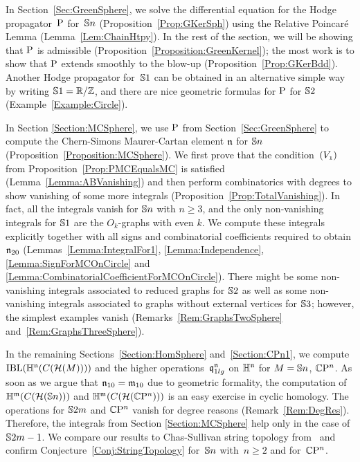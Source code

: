 \documentclass[\MainFolder/Text.tex]{subfiles}
\begin{document}
\label{Section:Computation}
In Section~\ref{Sec:GreenSphere}, we solve the differential equation for the Hodge propagator~$\mathrm{P}$ for~$\mathbb{S}{n}$ (Proposition~\ref{Prop:GKerSph}) using the Relative Poincar\'e Lemma (Lemma~\ref{Lem:ChainHtpy}). In the rest of the section, we will be showing that $\mathrm{P}$ is admissible (Proposition~\ref{Proposition:GreenKernel}); the most work is to show that $\mathrm{P}$ extends smoothly to the blow-up (Proposition~\ref{Prop:GKerBdd}). Another Hodge propagator for~$\mathbb{S}{1}$ can be obtained in an alternative simple way by writing $\mathbb{S}{1} = \mathbb{R} / \mathbb{Z}$, and there are nice geometric formulas for $\mathrm{P}$ for $\mathbb{S}{2}$ (Example~\ref{Example:Circle}).

In Section \ref{Section:MCSphere}, we use $\mathrm{P}$ from Section~\ref{Sec:GreenSphere} to compute the Chern-Simons Maurer-Cartan element $\mathfrak{n}$ for $\mathbb{S}{n}$ (Proposition~\ref{Proposition:MCSphere}). We first prove that the condition~$(V_{\NOne})$ from Proposition~\ref{Prop:PMCEqualsMC} is satisfied (Lemma~\ref{Lemma:ABVanishing}) and then perform combinatorics with degrees to show vanishing of some more integrals (Proposition~\ref{Prop:TotalVanishing}). In fact, all the integrals vanish for $\mathbb{S}{n}$ with $n\ge 3$, and the only non-vanishing integrals for $\mathbb{S}{1}$ are the $O_k$-graphs with even $k$. We compute these integrals explicitly together with all signs and combinatorial coefficients required to obtain $\mathfrak{n}_{20}$ (Lemmas~\ref{Lemma:IntegralFor1}, \ref{Lemma:Independence}, \ref{Lemma:SignForMCOnCircle} and  \ref{Lemma:CombinatorialCoefficientForMCOnCircle}). There might be some non-vanishing integrals associated to reduced graphs for $\mathbb{S}{2}$ as well as some non-vanishing integrals associated to graphs without external vertices for $\mathbb{S}{3}$; however, the simplest examples vanish (Remarks~\ref{Rem:GraphsTwoSphere} and~\ref{Rem:GraphsThreeSphere}).  

In the remaining Sections~\ref{Section:HomSphere} and~\ref{Section:CPn1}, we compute $\mathrm{IBL}(\mathbb{H}^{\mathfrak{n}}(C(\mathcal{H}(M))))$ and the higher operations~$\mathfrak{q}_{1lg}^{\mathfrak{n}}$ on $\mathbb{H}^{\mathfrak{n}}$ for $M = \mathbb{S}{n}$, $\mathbb{C}\mathrm{P}^n$. As soon as we argue that $\mathfrak{n}_{10} = \mathfrak{m}_{10}$ due to geometric formality, the computation of $\mathbb{H}^{\mathfrak{m}}(C(\mathcal{H}(\mathbb{S}{n})))$ and $\mathbb{H}^{\mathfrak{m}}(C(\mathcal{H}(\mathbb{C}\mathrm{P}^n)))$ is an easy exercise in cyclic homology. The operations for $\mathbb{S}{2m}$ and $\mathbb{C}\mathrm{P}^n$ vanish for degree reasons (Remark~\ref{Rem:DegRes}). Therefore, the integrals from Section \ref{Section:MCSphere} help only in the case of $\mathbb{S}{2m-1}$. We compare our results to Chas-Sullivan string topology from~\cite{Basu2011} and confirm Conjecture~\ref{Conj:StringTopology} for~$\mathbb{S}{n}$ with~$n\ge 2$ and for~$\mathbb{C}\mathrm{P}^n$.
\end{document}
